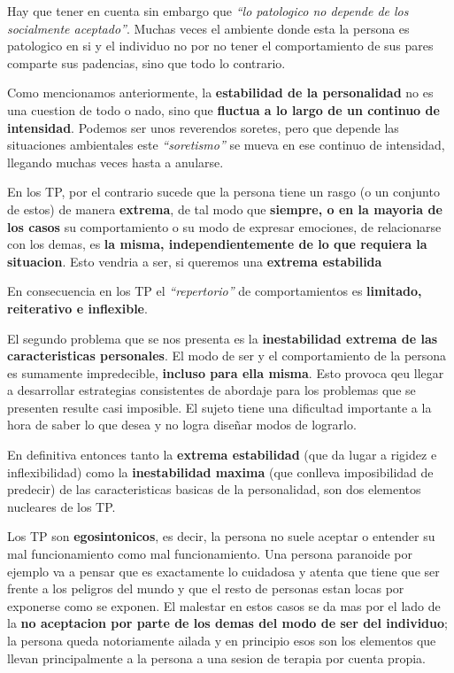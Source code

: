 \documentclass[12pt,a4paper]{article}
\begin{document}
Hay que tener en cuenta sin embargo que \textit{\enquote{lo patologico no depende de los socialmente aceptado}}. Muchas veces el ambiente donde esta la persona es patologico en si y el individuo no por no tener el comportamiento de sus pares comparte sus padencias, sino que todo lo contrario.

Como mencionamos anteriormente, la \textbf{estabilidad de la personalidad} no es una cuestion de todo o nado, sino que \textbf{fluctua a lo largo de un continuo de intensidad}. Podemos ser unos reverendos soretes, pero que depende las situaciones ambientales este \textit{\enquote{soretismo}} se mueva en ese continuo de intensidad, llegando muchas veces hasta a anularse. 

En los TP, por el contrario sucede que la persona tiene un rasgo (o un conjunto de estos) de manera \textbf{extrema}, de tal modo que \textbf{siempre, o en la mayoria de los casos} su comportamiento o su modo de expresar emociones, de relacionarse con los demas, es \textbf{la misma, independientemente de lo que requiera la situacion}. Esto vendria a ser, si queremos una \textbf{extrema estabilida}

En consecuencia en los TP el \textit{\enquote{repertorio}} de comportamientos es \textbf{limitado, reiterativo e inflexible}. 

El segundo problema que se nos presenta es la \textbf{inestabilidad extrema de las caracteristicas personales}. El modo de ser y el comportamiento de la persona es sumamente impredecible, \textbf{incluso para ella misma}. Esto provoca qeu llegar a desarrollar estrategias consistentes de abordaje para los problemas que se presenten resulte casi imposible. El sujeto tiene una dificultad importante a la hora de saber lo que desea y no logra diseñar modos de lograrlo. 

En definitiva entonces tanto la \textbf{extrema estabilidad} (que da lugar a rigidez e inflexibilidad) como la \textbf{inestabilidad maxima} (que conlleva imposibilidad de predecir) de las caracteristicas basicas de la personalidad, son dos elementos nucleares de los TP. 

Los TP son \textbf{egosintonicos}, es decir, la persona no suele aceptar o entender su mal funcionamiento como mal funcionamiento. Una persona paranoide por ejemplo va a pensar que es exactamente lo cuidadosa y atenta que tiene que ser frente a los peligros del mundo y que el resto de personas estan locas por exponerse como se exponen. El malestar en estos casos se da mas por el lado de la \textbf{no aceptacion por parte de los demas del modo de ser del individuo}; la persona queda notoriamente ailada y en principio esos son los elementos que llevan principalmente a la persona a una sesion de terapia por cuenta propia.
\end{document}
